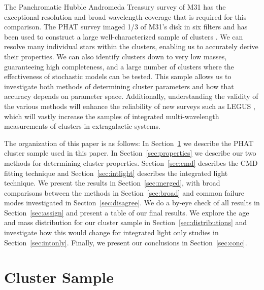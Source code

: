 \documentclass{emulateapj}
\begin{document}
The Panchromatic Hubble Andromeda Treasury  \citep[PHAT;][] {Dalcanton12} survey of M31 has the exceptional resolution and broad wavelength coverage that is required for this comparison.  The PHAT survey imaged 1/3 of M31's disk in six filters \citep{Williams14} and has been used to construct a large well-characterized sample of clusters \citep{Johnson15}.  We can resolve many individual stars within the clusters, enabling us to accurately derive their properties.  We can also identify clusters down to very low masses, guaranteeing high completeness, and a large number of clusters where the effectiveness of stochastic models can be tested.  This sample allows us to investigate both methods of determining cluster parameters and how that accuracy depends on parameter space.  Additionally, understanding the validity of the various methods will enhance the reliability of new surveys such as LEGUS \citep{Calzetti15}, which will vastly increase the samples of integrated multi-wavelength measurements of clusters in extragalactic systems.

The organization of this paper is as follows:  In Section~\ref{sec:sample} we describe the PHAT cluster sample used in this paper.  In Section~\ref{sec:properties} we describe our two methods for determining cluster properties.  Section~\ref{sec:cmd} describes the CMD fitting technique and Section~\ref{sec:intlight} describes the integrated light technique.  We present the results in Section~\ref{sec:merged}, with broad comparisons between the methods in Section~\ref{sec:broad} and common failure modes investigated in Section~\ref{sec:disagree}.  We do a by-eye check of all results in Section~\ref{sec:assign} and present a table of our final results.  We explore the age and mass distribution for our cluster sample in Section~\ref{sec:distributions} and investigate how this would change for integrated light only studies in Section~\ref{sec:intonly}.  Finally, we present our conclusions in Section~\ref{sec:conc}.




\section{Cluster Sample} \label{sec:sample}
\end{document}
